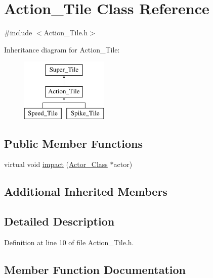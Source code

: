 \hypertarget{class_action___tile}{}\section{Action\+\_\+\+Tile Class Reference}
\label{class_action___tile}


{\ttfamily \#include $<$Action\+\_\+\+Tile.\+h$>$}

Inheritance diagram for Action\+\_\+\+Tile\+:\begin{figure}[H]
\begin{center}
\leavevmode
\includegraphics[height=3.000000cm]{class_action___tile}
\end{center}
\end{figure}
\subsection*{Public Member Functions}
\begin{DoxyCompactItemize}
\item 
virtual void \hyperlink{class_action___tile_aa366fba2ea9d3947c28c45f939ee0217}{impact} (\hyperlink{class_actor___class}{Actor\+\_\+\+Class} $\ast$actor)
\end{DoxyCompactItemize}
\subsection*{Additional Inherited Members}


\subsection{Detailed Description}


Definition at line 10 of file Action\+\_\+\+Tile.\+h.



\subsection{Member Function Documentation}
\hypertarget{class_action___tile_aa366fba2ea9d3947c28c45f939ee0217}{}\label{class_action___tile_aa366fba2ea9d3947c28c45f939ee0217} 
